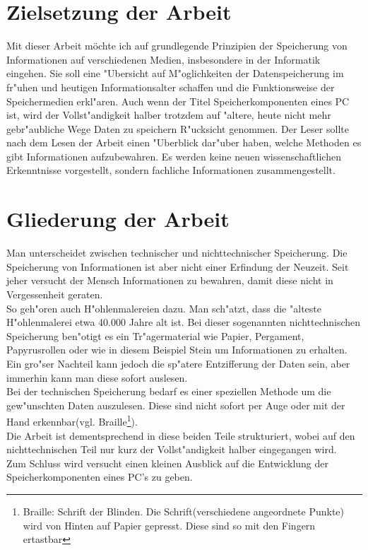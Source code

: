 \section{Zielsetzung der Arbeit}
\label{ch:Einleitung:sec:Zielsetzung}

Mit dieser Arbeit möchte ich auf grundlegende Prinzipien der Speicherung von Informationen auf verschiedenen Medien, insbesondere in der Informatik eingehen. Sie soll eine "Ubersicht auf M"oglichkeiten der Datenspeicherung im fr"uhen und heutigen Informationsalter schaffen und die Funktionsweise der Speichermedien erkl"aren. Auch wenn der Titel \glqq Speicherkomponenten eines PC \grqq{} ist, wird der Vollst"andigkeit halber trotzdem auf "altere, heute nicht mehr gebr"aubliche Wege Daten zu speichern R"ucksicht genommen. Der Leser sollte nach dem Lesen der Arbeit einen "Uberblick dar"uber haben, welche Methoden es gibt Informationen aufzubewahren. Es werden keine neuen wissenschaftlichen Erkenntnisse vorgestellt, sondern fachliche Informationen zusammengestellt.

\section{Gliederung der Arbeit}
\label{ch:Einleitung:sec:Gliederung}

Man unterscheidet zwischen technischer und nichttechnischer Speicherung. Die Speicherung von Informationen ist aber nicht einer Erfindung der Neuzeit. Seit jeher versucht der Mensch Informationen zu bewahren, damit diese nicht in Vergessenheit geraten. 
\\
So geh"oren auch H"ohlenmalereien dazu. Man sch"atzt, dass die "alteste H"ohlenmalerei etwa 40.000 Jahre alt ist. Bei dieser sogenannten nichttechnischen Speicherung ben"otigt es ein Tr"agermaterial wie Papier, Pergament, Papyrusrollen oder wie in diesem Beispiel Stein um Informationen zu erhalten. Ein gro"ser Nachteil kann jedoch die sp"atere Entzifferung der \glqq Daten\grqq{} sein, aber immerhin kann man diese sofort auslesen.
\\
Bei der technischen Speicherung bedarf es einer speziellen Methode um die gew"unschten Daten auszulesen. Diese sind nicht sofort per Auge oder mit der Hand erkennbar(vgl. Braille\footnote[2]{Braille: Schrift der Blinden. Die Schrift(verschiedene angeordnete Punkte) wird von Hinten auf Papier gepresst. Diese sind so mit den Fingern ertastbar}).
\\
Die Arbeit ist dementsprechend in diese beiden Teile strukturiert, wobei auf den nichttechnischen Teil nur kurz der Vollst"andigkeit halber eingegangen wird. 
\\
Zum Schluss wird versucht einen kleinen Ausblick auf die Entwicklung der Speicherkomponenten eines PC's zu geben.

